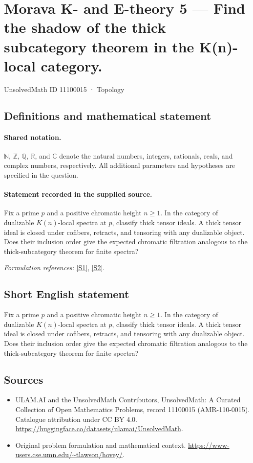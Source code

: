 \documentclass[11pt]{article}
\newcommand{\sref}[2]{\hyperlink{source:#1:#2}{[S#2]}}
\begin{document}
\setcounter{section}{11100014}
\section{Morava K- and E-theory 5 — Find the shadow of the thick subcategory theorem in the K(n)-local category.}\label{11100015}
{\small UnsolvedMath ID 11100015 · Topology}
\subsection{Definitions and mathematical statement}

\paragraph{Shared notation.}$\mathbb N$, $\mathbb Z$, $\mathbb Q$, $\mathbb R$, and $\mathbb C$ denote the natural numbers, integers, rationals, reals, and complex numbers, respectively. All additional parameters and hypotheses are specified in the question.


\paragraph{Statement recorded in the supplied source.}
Fix a prime $p$ and a positive chromatic height $n\ge1$. In the category of dualizable $K(n)$-local spectra at $p$, classify thick tensor ideals. A thick tensor ideal is closed under cofibers, retracts, and tensoring with any dualizable object. Does their inclusion order give the expected chromatic filtration analogous to the thick-subcategory theorem for finite spectra?
\par\smallskip\textit{Formulation references:} \sref{11100015}{1}, \sref{11100015}{2}.
\subsection{Short English statement}
Fix a prime $p$ and a positive chromatic height $n\ge1$. In the category of dualizable $K(n)$-local spectra at $p$, classify thick tensor ideals. A thick tensor ideal is closed under cofibers, retracts, and tensoring with any dualizable object. Does their inclusion order give the expected chromatic filtration analogous to the thick-subcategory theorem for finite spectra?
\subsection{Sources}
\begin{itemize}
\item[\hypertarget{source:11100015:1}{S1}] ULAM.AI and the UnsolvedMath Contributors, UnsolvedMath: A Curated Collection of Open Mathematics Problems, record 11100015 (AMR-110-0015). Catalogue attribution under CC BY 4.0.
\url{https://huggingface.co/datasets/ulamai/UnsolvedMath}.
\item[\hypertarget{source:11100015:2}{S2}] Original problem formulation and mathematical context.
\url{https://www-users.cse.umn.edu/~tlawson/hovey/}.
\end{itemize}
\label{end:11100015}
\end{document}
